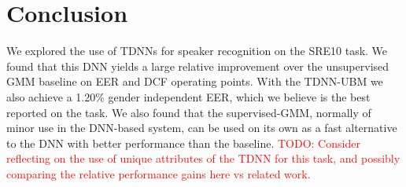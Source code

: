 \documentclass{article}
\newcommand\davidnote[1]{\textcolor{red}{#1}}
\begin{document}
\section{Conclusion}

We explored the use of TDNNs for speaker recognition on the SRE10 task.
We found that this DNN yields a large relative improvement over the
unsupervised GMM baseline on EER and DCF operating points. With the
TDNN-UBM we also achieve a 1.20\% gender independent EER, 
which we believe is the best
reported on the task. We also found that the supervised-GMM, normally
of minor use in the DNN-based system, can be 
used on its own as a fast alternative to the DNN with better performance
than the baseline. 
\davidnote{TODO: Consider reflecting on the use of unique attributes
of the TDNN for this task, and possibly comparing the relative 
performance gains here vs related work.}




\end{document}
